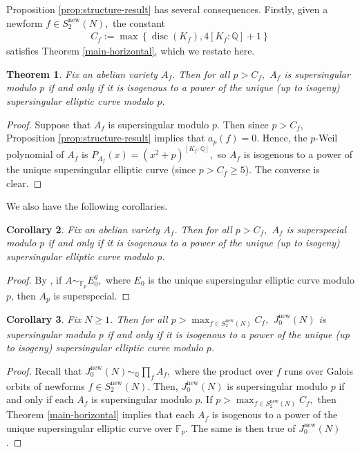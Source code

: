 \documentclass[11pt,letterpaper,reqno]{amsart}
\newtheorem{theorem}{Theorem}[section]
\newtheorem{corollary}[theorem]{Corollary}
\theoremstyle{definition}
\numberwithin{equation}{section}
\numberwithin{figure}{section}
\numberwithin{table}{section}
\newcommand{\nw}{\mathrm{new}}
\begin{document}
Proposition \ref{prop:structure-result} has several consequences. Firstly, given a newform $f \in S_2^\nw(N),$ the constant
\begin{align}
    C_f := \max \left\{ \operatorname{disc}(K_f), 4[K_f : \mathbb{Q}] + 1\right\} \label{eqn:constant-C-f}
\end{align}
satisfies Theorem \ref{main-horizontal}, which we restate here.

{
\renewcommand{\thetheorem}{\ref{main-horizontal}}
\begin{theorem}
    Fix an abelian variety $A_f$. Then for all $p > C_f,$ $A_f$ is supersingular modulo $p$ if and only if it is isogenous to a power of the unique (up to isogeny) supersingular elliptic curve modulo $p$. 
\end{theorem}
\addtocounter{theorem}{-1}
}

\begin{proof}
Suppose that $A_f$ is supersingular modulo $p.$ 
Then since $p > C_f$, Proposition \ref{prop:structure-result} implies that $a_p(f) = 0$. Hence, the $p$-Weil polynomial of $A_f$ is $P_{A_f}(x) = (x^2+p)^{[K_f:\mathbb{Q}]},$ so $A_f$ is isogenous to a power of the unique supersingular elliptic curve (since $p > C_f  \geq 5$). The converse is clear.
\end{proof}

We also have the following corollaries.

\begin{corollary}\label{superspecial}
Fix an abelian variety $A_f$. Then for all $p > C_f,$ $A_f$ is superspecial modulo $p$ if and only if it is isogenous to a power of the unique (up to isogeny) supersingular elliptic curve modulo $p$. 
\end{corollary}

\begin{proof}
By \cite[Lemma 2.2]{yu2011superspecial}, if $A \sim_{\mathbb{F}_p} E_0^g,$ where $E_0$ is the unique supersingular elliptic curve modulo $p$, then $A_p$ is superspecial.
\end{proof}

\begin{corollary}\label{cor:horizontal-result-for-Jac}
    Fix $N \ge 1$. Then for all $p > \max_{f \in S_2^{\nw}(N)} C_f,$ $J_0^{\nw}(N)$ is supersingular modulo $p$ if and only if
    it is isogenous to a power of the unique (up to isogeny) supersingular elliptic curve modulo $p$. 
\end{corollary}

\begin{proof}
    Recall that $J_0^{\nw}(N) \sim_{\mathbb{Q}} \prod_{f} A_f \label{eqn:decomp-J_0-new-mod-p},$ where the product over $f$ runs over Galois orbits of newforms $f \in S_2^{\nw}(N)$. Then, $J_0^{\nw}(N)$ is supersingular modulo $p$ if and only if each $A_f$ is supersingular modulo $p.$ If $p > \max_{f \in S_2^{\nw}(N)} C_f,$ then Theorem \ref{main-horizontal} implies that each $A_f$ is isogenous to a power of the unique supersingular elliptic curve over $\mathbb{F}_p$. The same is then true of $J_0^\nw(N)$.
\end{proof}
 
\end{document}
